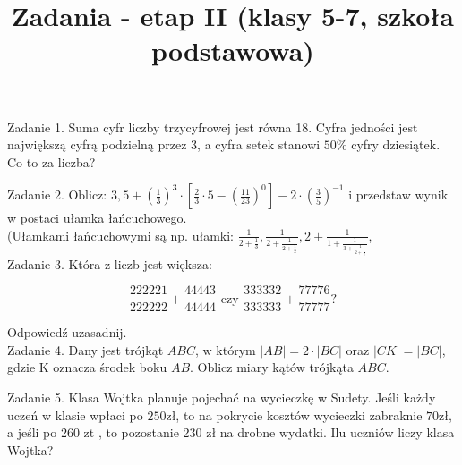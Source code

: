 \documentclass[10pt]{article}
\title{Zadania - etap II (klasy 5-7, szkoła podstawowa) }
\author{}
\date{}
\begin{document}
\maketitle
Zadanie 1. Suma cyfr liczby trzycyfrowej jest równa 18. Cyfra jedności jest największą cyfrą podzielną przez 3, a cyfra setek stanowi \(50 \%\) cyfry dziesiątek. Co to za liczba?

Zadanie 2. Oblicz: \(3,5+\left(\frac{1}{3}\right)^{3} \cdot\left[\frac{2}{3} \cdot 5-\left(\frac{11}{23}\right)^{0}\right]-2 \cdot\left(\frac{3}{5}\right)^{-1}\) i przedstaw wynik w postaci ułamka łańcuchowego.\\
(Ułamkami łańcuchowymi są np. ułamki: \(\frac{1}{2+\frac{1}{3}}, \frac{1}{2+\frac{1}{2+\frac{1}{2}}}, 2+\frac{1}{1+\frac{1}{3+\frac{1}{2+\frac{1}{2}}}}\),\\
Zadanie 3. Która z liczb jest większa:

\[
\frac{222221}{222222}+\frac{44443}{44444} \text { czy } \frac{333332}{333333}+\frac{77776}{77777} ?
\]

Odpowiedź uzasadnij.\\
Zadanie 4. Dany jest trójkąt \(A B C\), w którym \(|A B|=2 \cdot|B C|\) oraz \(|C K|=|B C|\), gdzie K oznacza środek boku \(A B\). Oblicz miary kątów trójkąta \(A B C\).

Zadanie 5. Klasa Wojtka planuje pojechać na wycieczkę w Sudety. Jeśli każdy uczeń w klasie wpłaci po \(250 \mathrm{zł}\), to na pokrycie kosztów wycieczki zabraknie \(70 \mathrm{zł}\), a jeśli po 260 zt , to pozostanie 230 zł na drobne wydatki. Ilu uczniów liczy klasa Wojtka?
\end{document}
